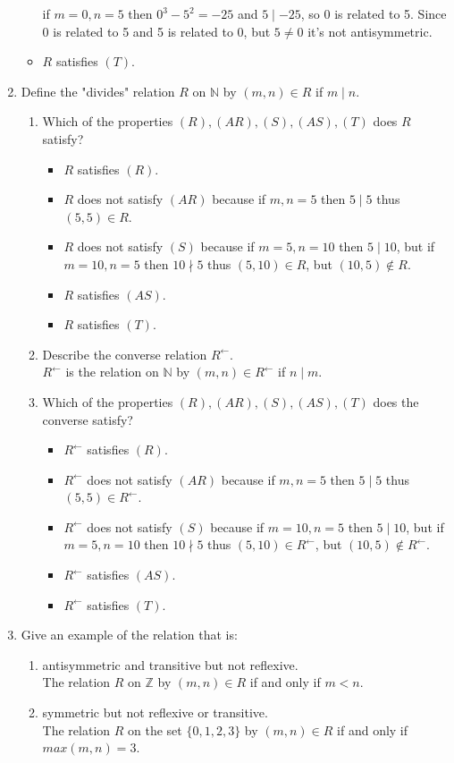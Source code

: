 \documentclass[11pt]{article}
\newcommand{\N}{\mathbb{N}}
\newcommand{\Z}{\mathbb{Z}}
\begin{document}
\begin{enumerate}
\begin{itemize}
	if $m=0,n=5$ then $0^3-5^2=-25$ and $5\mid-25$, so 0 is related to 5. Since 0 is related to 5 and 5 is 
	related to 0, but $5\not=0$ it's not antisymmetric.
	\item $R$ satisfies $(T)$. 
	\end{itemize}
\item Define the "divides" relation $R$ on $\N$ by $(m,n)\in R$ if $m\mid n$.
	\begin{enumerate}
	\item Which of the properties $(R),(AR),(S),(AS),(T)$ does $R$ satisfy?\\
		\begin{itemize}
		\item $R$ satisfies $(R)$.
		\item $R$ does not satisfy $(AR)$ because if $m,n=5$ then $5\mid5$ thus $(5,5)\in R$.
		\item $R$ does not satisfy $(S)$ because if $m=5,n=10$ then $5\mid10$, but if $m=10,n=5$ then $10\nmid5$ thus 
		$(5,10)\in R$, but $(10,5)\not\in R$.
		\item $R$ satisfies $(AS)$.
		\item $R$ satisfies $(T)$.
		\end{itemize}
	\item Describe the converse relation $R^\gets$.\\
	$R^\gets$ is the relation on $\N$ by $(m,n)\in R^\gets$ if $n\mid m$.
	\item Which of the properties $(R),(AR),(S),(AS),(T)$ does the converse satisfy?
		\begin{itemize}
		\item $R^\gets$ satisfies $(R)$.
		\item $R^\gets$ does not satisfy $(AR)$ because if $m,n=5$ then $5\mid5$ thus \\$(5,5)\in 
		R^\gets$.
		\item $R^\gets$ does not satisfy $(S)$ because if $m=10,n=5$ then $5\mid10$, 
		but if $m=5,n=10$ then $10\nmid5$ thus $(5,10)\in R^\gets$, but $(10,5)\not\in R^\gets$.
		\item $R^\gets$ satisfies $(AS)$.
		\item $R^\gets$ satisfies $(T)$.
		\end{itemize}
	\end{enumerate}
\setcounter{enumi}{9}
\item Give an example of the relation that is:
	\begin{enumerate}
	\item antisymmetric and transitive but not reflexive.\\
	The relation $R$ on $\Z$ by $(m,n)\in R$ if and only if $m<n$.
	\item symmetric but not reflexive or transitive.\\
	The relation $R$ on the set $\{0,1,2,3\}$ by $(m,n)\in R$ if and only if $max(m,n)=3$.
	\end{enumerate}
\end{enumerate}
\end{document}
